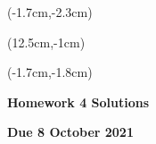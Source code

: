 \documentclass[12pt, oneside]{article}
\begin{document}
\begin{textblock*}{4cm}(-1.7cm,-2.3cm)
\end{textblock*}

\begin{textblock*}{8cm}(12.5cm,-1cm)
\end{textblock*}
\begin{textblock*}{13.5cm}(-1.7cm,-1.8cm)
\end{textblock*}

\vspace{1cm}

\begin{center}
\textbf{\Large Homework 4 Solutions}

\textbf{Due 8 October 2021}
\end{center}
\end{document}
